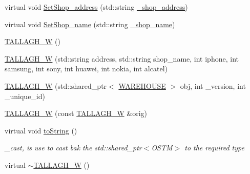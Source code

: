 \begin{DoxyCompactItemize}
\item 
virtual void \hyperlink{class_t_a_l_l_a_g_h___w_a45bd91f41ac4d384b4281e6572bc2f8a_a45bd91f41ac4d384b4281e6572bc2f8a}{Set\+Shop\+\_\+address} (std\+::string \hyperlink{class_t_a_l_l_a_g_h___w_a268003f2cd359fa50c6061f1ad011c67_a268003f2cd359fa50c6061f1ad011c67}{\+\_\+shop\+\_\+address})
\item 
virtual void \hyperlink{class_t_a_l_l_a_g_h___w_a3ab6212769f348c15cd2d242af70ea02_a3ab6212769f348c15cd2d242af70ea02}{Set\+Shop\+\_\+name} (std\+::string \hyperlink{class_t_a_l_l_a_g_h___w_a2d63785f290e8be76f3c4543e5df9508_a2d63785f290e8be76f3c4543e5df9508}{\+\_\+shop\+\_\+name})
\item 
\hyperlink{class_t_a_l_l_a_g_h___w_aeafc411edee7a3e8bfcc54fa478e2104_aeafc411edee7a3e8bfcc54fa478e2104}{T\+A\+L\+L\+A\+G\+H\+\_\+W} ()
\item 
\hyperlink{class_t_a_l_l_a_g_h___w_a2d61c90d6ff2f1b50f81a3ce6506e285_a2d61c90d6ff2f1b50f81a3ce6506e285}{T\+A\+L\+L\+A\+G\+H\+\_\+W} (std\+::string address, std\+::string shop\+\_\+name, int iphone, int samsung, int sony, int huawei, int nokia, int alcatel)
\item 
\hyperlink{class_t_a_l_l_a_g_h___w_a34d0767d7e66f28b1e9725c27f964a9c_a34d0767d7e66f28b1e9725c27f964a9c}{T\+A\+L\+L\+A\+G\+H\+\_\+W} (std\+::shared\+\_\+ptr$<$ \hyperlink{class_w_a_r_e_h_o_u_s_e}{W\+A\+R\+E\+H\+O\+U\+SE} $>$ obj, int \+\_\+version, int \+\_\+unique\+\_\+id)
\item 
\hyperlink{class_t_a_l_l_a_g_h___w_a92cfa48ee385c9299427e4fa95b57003_a92cfa48ee385c9299427e4fa95b57003}{T\+A\+L\+L\+A\+G\+H\+\_\+W} (const \hyperlink{class_t_a_l_l_a_g_h___w}{T\+A\+L\+L\+A\+G\+H\+\_\+W} \&orig)
\item 
virtual void \hyperlink{class_t_a_l_l_a_g_h___w_ac7a438b7511cf2931490e6b44eff4a49_ac7a438b7511cf2931490e6b44eff4a49}{to\+String} ()
\begin{DoxyCompactList}\small\item\em \+\_\+cast, is use to cast bak the std\+::shared\+\_\+ptr$<$\+O\+S\+T\+M$>$ to the required type \end{DoxyCompactList}\item 
virtual \hyperlink{class_t_a_l_l_a_g_h___w_aad3a2ca2d942a0629716b1c9f446931f_aad3a2ca2d942a0629716b1c9f446931f}{$\sim$\+T\+A\+L\+L\+A\+G\+H\+\_\+W} ()
\end{DoxyCompactItemize}
